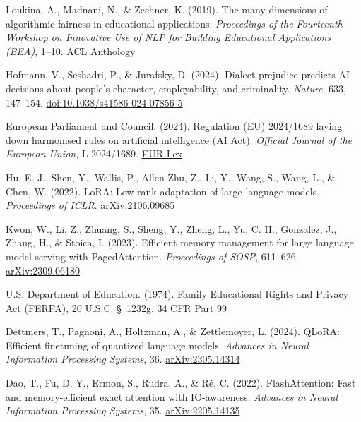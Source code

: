 \documentclass[12pt]{article}
\begin{document}
\begin{enumerate}[label={[\arabic*]}, leftmargin=*, itemsep=4pt]
    \item \hypertarget{ref8}{} Loukina, A., Madnani, N., \& Zechner, K. (2019). The many dimensions of algorithmic fairness in educational applications. \textit{Proceedings of the Fourteenth Workshop on Innovative Use of NLP for Building Educational Applications (BEA)}, 1--10. \href{https://aclanthology.org/W19-4401/}{ACL Anthology}

    \item \hypertarget{ref9}{} Hofmann, V., Seshadri, P., \& Jurafsky, D. (2024). Dialect prejudice predicts AI decisions about people's character, employability, and criminality. \textit{Nature}, 633, 147--154. \href{https://doi.org/10.1038/s41586-024-07856-5}{doi:10.1038/s41586-024-07856-5}

    \item \hypertarget{ref10}{} European Parliament and Council. (2024). Regulation (EU) 2024/1689 laying down harmonised rules on artificial intelligence (AI Act). \textit{Official Journal of the European Union}, L 2024/1689. \href{https://eur-lex.europa.eu/eli/reg/2024/1689/oj}{EUR-Lex}

    \item \hypertarget{ref11}{} Hu, E. J., Shen, Y., Wallis, P., Allen-Zhu, Z., Li, Y., Wang, S., Wang, L., \& Chen, W. (2022). LoRA: Low-rank adaptation of large language models. \textit{Proceedings of ICLR}. \href{https://arxiv.org/abs/2106.09685}{arXiv:2106.09685}

    \item \hypertarget{ref12}{} Kwon, W., Li, Z., Zhuang, S., Sheng, Y., Zheng, L., Yu, C. H., Gonzalez, J., Zhang, H., \& Stoica, I. (2023). Efficient memory management for large language model serving with PagedAttention. \textit{Proceedings of SOSP}, 611--626. \href{https://arxiv.org/abs/2309.06180}{arXiv:2309.06180}

    \item \hypertarget{ref13}{} U.S. Department of Education. (1974). Family Educational Rights and Privacy Act (FERPA), 20 U.S.C. \S~1232g. \href{https://www.ecfr.gov/current/title-34/subtitle-A/part-99}{34 CFR Part 99}

    \item \hypertarget{ref14}{} Dettmers, T., Pagnoni, A., Holtzman, A., \& Zettlemoyer, L. (2024). QLoRA: Efficient finetuning of quantized language models. \textit{Advances in Neural Information Processing Systems}, 36. \href{https://arxiv.org/abs/2305.14314}{arXiv:2305.14314}

    \item \hypertarget{ref15}{} Dao, T., Fu, D. Y., Ermon, S., Rudra, A., \& R\'{e}, C. (2022). FlashAttention: Fast and memory-efficient exact attention with IO-awareness. \textit{Advances in Neural Information Processing Systems}, 35. \href{https://arxiv.org/abs/2205.14135}{arXiv:2205.14135}


\end{enumerate}
\end{document}
